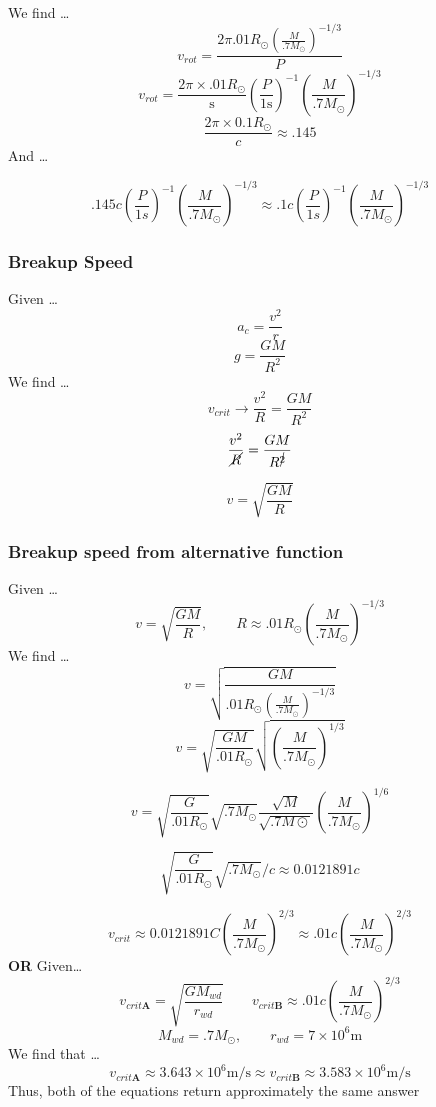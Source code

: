 \documentclass{article}
\begin{document}
We find \dots
\[v_{rot}= \frac{2\pi .01R_\odot \left(\frac{M}{.7M_\odot}\right)^{-1/3}}{P}\]
\[v_{rot}= \frac{2\pi \times  .01R_\odot}{\text{s}} \left(\frac{P}{1\text{s}}\right)^{-1}\left(\frac{M}{.7M_\odot}\right)^{-1/3}\]
\[\frac{2\pi \times 0.1R_\odot}{c} \approx .145\]
And \dots

\[\boxed{.145c\left(\frac{P}{1s}\right)^{-1}\left(\frac{M}{.7M_\odot}\right)^{-1/3} \approx .1c\left(\frac{P}{1s}\right)^{-1}\left(\frac{M}{.7M_\odot}\right)^{-1/3} }\]




\subsubsection{Breakup Speed}
Given \dots
\[a_c = \frac{v^2}{r}\]
\[g = \frac{GM}{R^2}\]
We find \dots
\[v_{crit} \rightarrow \frac{v^2}{R} = \frac{GM}{R^2}\]
\[\frac{v^2}{\cancel{R}} = \frac{GM}{R^{\cancel{2}}}\]

\[\boxed{v = \sqrt{\frac{GM}{R}}}\]
\subsubsection{Breakup speed from alternative function}
Given \dots
\[v = \sqrt{\frac{GM}{R}}, \qquad  R \approx .01R_\odot \left(\frac{M}{.7M_\odot}\right)^{-1/3}\]
We find \dots
\[v = \sqrt{\frac{GM}{.01R_\odot \left(\frac{M}{.7M_\odot}\right)^{-1/3}}}\]
\[v = \sqrt{\frac{GM}{.01R_\odot}} \sqrt{\left(\frac{M}{.7M_\odot}\right)^{1/3}}\]

\[v = \sqrt{\frac{G}{.01R_\odot}} \sqrt{.7M_\odot} \frac{\sqrt{M}}{\sqrt{.7M\odot}}\left(\frac{M}{.7M_\odot}\right)^{1/6}\]

\[\sqrt{\frac{G}{.01R_\odot}} \sqrt{.7M_\odot}/c \approx 0.0121891c\]

\[\boxed{v_{crit} \approx 0.0121891C \left(\frac{M}{.7M_\odot}\right)^{2/3} \approx .01c \left(\frac{M}{.7M_\odot}\right)^{2/3}}\]
\noindent \textbf{\large OR}
Given\dots
\[v_{crit \textbf{A}} = \sqrt{\frac{GM_{wd}}{r_{wd}}} \qquad v_{crit \textbf{B}}\approx .01c \left(\frac{M}{.7M_\odot}\right)^{2/3}\]
\[M_{wd} = .7M_\odot, \qquad r_{wd} = 7 \times 10^6 \text{m}\]
We find that \dots
\[\boxed{v_{crit \textbf{A}} \approx 3.643 \times 10^{6} \text{m/s}} \approx \boxed{v_{crit \textbf{B}} \approx 3.583 \times 10^{6} \text{m/s}}\]
Thus, both of the equations return approximately the same answer
\end{document}
